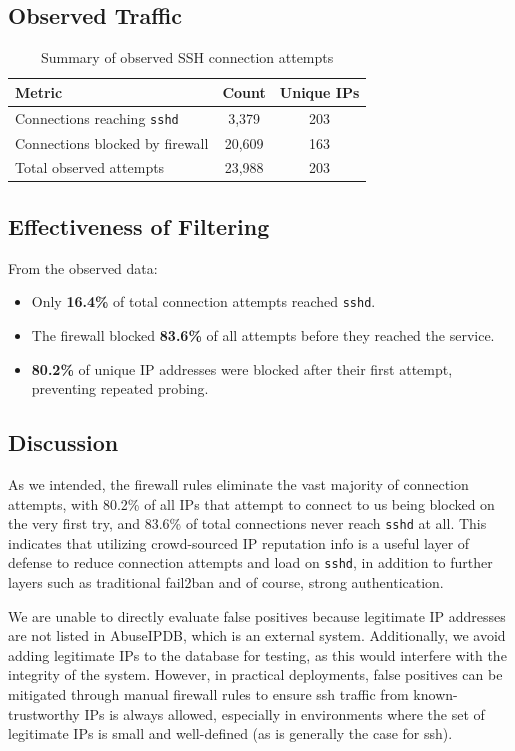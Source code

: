 \documentclass[11pt, letterpaper]{article}
\begin{document}
\subsection{Observed Traffic}
\begin{table}[h]
\centering
\begin{tabular}{lcc}
\hline
\textbf{Metric} & \textbf{Count} & \textbf{Unique IPs} \\
\hline
Connections reaching \texttt{sshd} & 3,379 & 203 \\
Connections blocked by firewall & 20,609 & 163 \\
\hline
Total observed attempts & 23,988 & 203 \\
\hline
\end{tabular}
\caption{Summary of observed SSH connection attempts}
\end{table}

\subsection{Effectiveness of Filtering}
From the observed data:
\begin{itemize}
    \item Only \textbf{16.4\%} of total connection attempts reached \texttt{sshd}.
    \item The firewall blocked \textbf{83.6\%} of all attempts before they reached the service.
    \item \textbf{80.2\%} of unique IP addresses were blocked after their first attempt, preventing repeated probing.
\end{itemize}

\subsection{Discussion}
As we intended, the firewall rules eliminate the vast majority of connection attempts, with 80.2\% of all IPs that attempt to connect to us being blocked on the very first try, and 83.6\% of total connections never reach \texttt{sshd} at all. This indicates that utilizing crowd-sourced IP reputation info is a useful layer of defense to reduce connection attempts and load on \texttt{sshd}, in addition to further layers such as traditional fail2ban and of course, strong authentication.

We are unable to directly evaluate false positives because legitimate IP addresses are not listed in AbuseIPDB, which is an external system. Additionally, we avoid adding legitimate IPs to the database for testing, as this would interfere with the integrity of the system. However, in practical deployments, false positives can be mitigated through manual firewall rules to ensure ssh traffic from known-trustworthy IPs is always allowed, especially in environments where the set of legitimate IPs is small and well-defined (as is generally the case for ssh).
\end{document}
